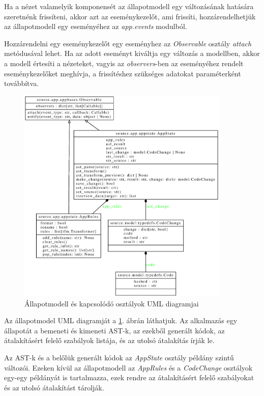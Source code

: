 Ha a nézet valamelyik komponensét az állapotmodell egy változásának hatására szeretnénk frissíteni,
akkor azt az eseménykezelőt, ami frissíti,
hozzárendelhetjük az állapotmodell egy eseményéhez az \emph{app.events} modulból.

Hozzárendelni egy eseménykezelőt egy eseményhez az \emph{Observable} osztály
\emph{attach} metódusával lehet.
Ha az adott eseményt kiváltja egy változás a modellben, akkor a modell értesíti a
nézeteket,
vagyis az \emph{observers}-ben az eseményéhez rendelt eseménykezelőket meghívja,
a frissítéshez szükséges adatokat paraméterként továbbítva.

\begin{figure}[H]
	\centering
	\includegraphics[width=0.9\textwidth]{images/uml/appstate.eps}
	\caption{\label{fig:AppState}Állapotmodell és kapcsolódó osztályok UML diagramjai}
\end{figure}

Az állapotmodel UML diagramját a \ref{fig:AppState}. ábrán láthatjuk.
Az alkalmazás egy állapotát a bemeneti és kimeneti AST-k, az ezekből generált kódok,
az átalakításért felelő szabályok listája, és az utolsó átalakítás írják le.

Az AST-k és a belőlük generált kódok az \emph{AppState} osztály példány szintű változói.
Ezeken kívül az állapotmodell az \emph{AppRules} és a \emph{CodeChange} osztályok egy-egy
példányát
is tartalmazza, ezek rendre az átalakításért felelő szabályokat és az utolsó átalakítást
tárolják.

